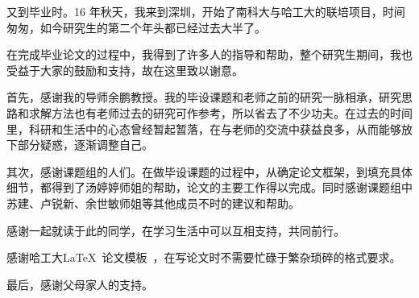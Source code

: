 \begin{acknowledgements}

又到毕业时。16 年秋天，我来到深圳，开始了南科大与哈工大的联培项目，时间匆匆，如今研究生的第二个年头都已经过去大半了。%

在完成毕业论文的过程中，我得到了许多人的指导和帮助，整个研究生期间，我也受益于大家的鼓励和支持，故在这里致以谢意。

首先，感谢我的导师余鹏教授。我的毕设课题和老师之前的研究一脉相承，研究思路和求解方法也有老师过去的研究可作参考，所以省去了不少功夫。在过去的时间里，科研和生活中的心态曾经暂起暂落，在与老师的交流中获益良多，从而能够放下部分疑惑，逐渐调整自己。

其次，感谢课题组的人们。在做毕设课题的过程中，从确定论文框架，到填充具体细节，都得到了汤婷婷师姐的帮助，论文的主要工作得以完成。同时感谢课题组中苏建、卢锐新、余世敏师姐等其他成员不时的建议和帮助。

感谢一起就读于此的同学，在学习生活中可以互相支持，共同前行。

感谢哈工大\LaTeX\ 论文模板\hithesis\ ，在写论文时不需要忙碌于繁杂琐碎的格式要求。

最后，感谢父母家人的支持。



\end{acknowledgements}
